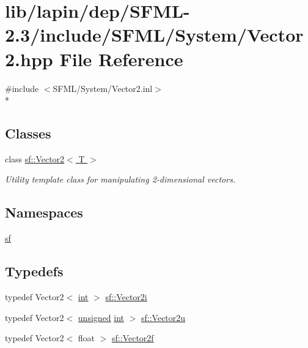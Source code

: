 \hypertarget{lib_2lapin_2dep_2_s_f_m_l-2_83_2include_2_s_f_m_l_2_system_2_vector2_8hpp}{\section{lib/lapin/dep/\-S\-F\-M\-L-\/2.3/include/\-S\-F\-M\-L/\-System/\-Vector2.hpp File Reference}
\label{lib_2lapin_2dep_2_s_f_m_l-2_83_2include_2_s_f_m_l_2_system_2_vector2_8hpp}
}
{\ttfamily \#include $<$S\-F\-M\-L/\-System/\-Vector2.\-inl$>$}\\*
\subsection*{Classes}
\begin{DoxyCompactItemize}
\item 
class \hyperlink{classsf_1_1_vector2}{sf\-::\-Vector2$<$ T $>$}
\begin{DoxyCompactList}\small\item\em Utility template class for manipulating 2-\/dimensional vectors. \end{DoxyCompactList}\end{DoxyCompactItemize}
\subsection*{Namespaces}
\begin{DoxyCompactItemize}
\item 
\hyperlink{namespacesf}{sf}
\end{DoxyCompactItemize}
\subsection*{Typedefs}
\begin{DoxyCompactItemize}
\item 
typedef Vector2$<$ \hyperlink{term__entry_8h_ad65b480f8c8270356b45a9890f6499ae}{int} $>$ \hyperlink{namespacesf_a0eed58bf66694ebbc55f72ca7de840d9}{sf\-::\-Vector2i}
\item 
typedef Vector2$<$ \hyperlink{curses_8priv_8h_aca40206900cfc164654362fa8d4ad1e6}{unsigned} \hyperlink{term__entry_8h_ad65b480f8c8270356b45a9890f6499ae}{int} $>$ \hyperlink{namespacesf_a41039649eb65ea7646e2b97cfe124b4f}{sf\-::\-Vector2u}
\item 
typedef Vector2$<$ float $>$ \hyperlink{namespacesf_a80cea3c46537294fd1d8d428566ad8b2}{sf\-::\-Vector2f}
\end{DoxyCompactItemize}
